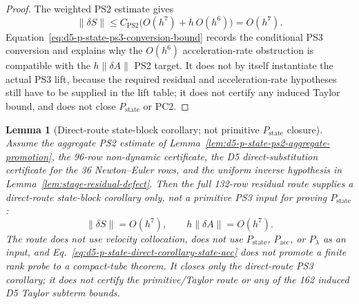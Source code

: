 \documentclass[preprint,12pt]{elsarticle}
\newtheorem{lemma}{Lemma}
\begin{document}
\begin{proof}
The weighted PS2 estimate gives
\begin{equation}
\label{eq:d5-p-state-ps3-conversion-bound}
\|\delta S\|\le C_{\mathrm{PS2}}
\bigl(O(h^7)+h\,O(h^6)\bigr)=O(h^7).
\end{equation}
Equation~\eqref{eq:d5-p-state-ps3-conversion-bound} records the conditional
PS3 conversion and explains why the
\(O(h^6)\) acceleration-rate obstruction is compatible with the
\(h\|\delta A\|\) PS2 target.  It does not by itself instantiate the actual
PS3 lift, because the required residual and acceleration-rate hypotheses still
have to be supplied in the lift table; it does not certify any induced Taylor
bound, and does not close \(P_{\mathrm{state}}\) or PC2.
\end{proof}

\begin{lemma}[Direct-route state-block corollary; not primitive \(P_{\mathrm{state}}\) closure]
\label{lem:d5-p-state-ps3-full-residual-route}
Assume the aggregate PS2 estimate of
Lemma~\ref{lem:d5-p-state-ps2-aggregate-promotion}, the 96-row
non-dynamic certificate, the D5 direct-substitution certificate for the
36 Newton--Euler rows, and the uniform inverse hypothesis in
Lemma~\ref{lem:stage-residual-defect}.  Then the full 132-row residual
route supplies a direct-route state-block corollary only, not a primitive
PS3 input for proving \(P_{\mathrm{state}}\):
\begin{equation}
\label{eq:d5-p-state-direct-corollary-state-acc}
  \|\delta S\|=O(h^7),
  \qquad
  h\|\delta A\|=O(h^7).
\end{equation}
The route does not use velocity collocation, does not use
\(P_{\mathrm{state}}\), \(P_{\mathrm{acc}}\), or \(P_{\lambda}\) as an
input, and Eq.~\eqref{eq:d5-p-state-direct-corollary-state-acc} does not
promote a finite rank probe to a compact-tube theorem.
It closes only the direct-route PS3 corollary; it does not certify the
primitive/Taylor route or any of the 162 induced D5 Taylor subterm bounds.
\end{lemma}
\end{document}
